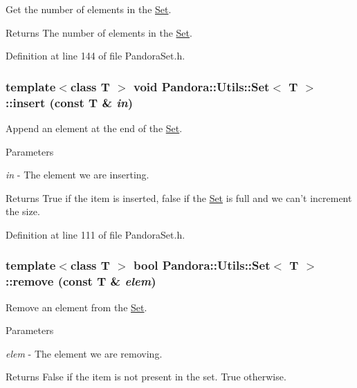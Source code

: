 Get the number of elements in the \hyperlink{classPandora_1_1Utils_1_1Set}{Set}. \begin{DoxyReturn}{Returns}
The number of elements in the \hyperlink{classPandora_1_1Utils_1_1Set}{Set}. 
\end{DoxyReturn}


Definition at line 144 of file PandoraSet.h.\hypertarget{classPandora_1_1Utils_1_1Set_a2c43d731fac0319a5be8c055aae33c8b}{
\subsubsection[{insert}]{\setlength{\rightskip}{0pt plus 5cm}template$<$class T $>$ void {\bf Pandora::Utils::Set}$<$ T $>$::insert (const T \& {\em in})}}
\label{classPandora_1_1Utils_1_1Set_a2c43d731fac0319a5be8c055aae33c8b}


Append an element at the end of the \hyperlink{classPandora_1_1Utils_1_1Set}{Set}. 
\begin{DoxyParams}{Parameters}
\item[{\em in}]-\/ The element we are inserting. \end{DoxyParams}
\begin{DoxyReturn}{Returns}
True if the item is inserted, false if the \hyperlink{classPandora_1_1Utils_1_1Set}{Set} is full and we can't increment the size. 
\end{DoxyReturn}


Definition at line 111 of file PandoraSet.h.\hypertarget{classPandora_1_1Utils_1_1Set_a5094548bb7e9ac74ebc29ae0c4f426a5}{
\subsubsection[{remove}]{\setlength{\rightskip}{0pt plus 5cm}template$<$class T $>$ bool {\bf Pandora::Utils::Set}$<$ T $>$::remove (const T \& {\em elem})}}
\label{classPandora_1_1Utils_1_1Set_a5094548bb7e9ac74ebc29ae0c4f426a5}


Remove an element from the \hyperlink{classPandora_1_1Utils_1_1Set}{Set}. 
\begin{DoxyParams}{Parameters}
\item[{\em elem}]-\/ The element we are removing. \end{DoxyParams}
\begin{DoxyReturn}{Returns}
False if the item is not present in the set. True otherwise. 
\end{DoxyReturn}


